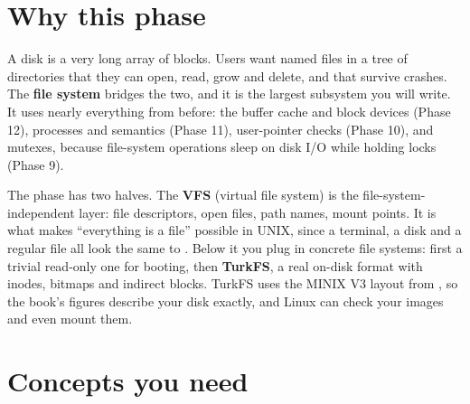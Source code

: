 \documentclass[11pt,a4paper]{article}
\begin{document}


\section{Why this phase}

A disk is a very long array of blocks. Users want named files in a tree of directories that they can open, read,
grow and delete, and that survive crashes. The \textbf{file system} bridges the two, and it is the largest subsystem
you will write. It uses nearly everything from before: the buffer cache and block devices (Phase 12), processes and
 semantics (Phase 11), user-pointer checks (Phase 10), and mutexes, because file-system operations sleep on
disk I/O while holding locks (Phase 9).

The phase has two halves. The \textbf{VFS} (virtual file system) is the file-system-independent layer: file
descriptors, open files, path names, mount points. It is what makes ``everything is a file'' possible in UNIX, since
a terminal, a disk and a regular file all look the same to . Below it you plug in concrete file systems:
first a trivial read-only one for booting, then \textbf{TurkFS}, a real on-disk format with inodes, bitmaps and
indirect blocks. TurkFS uses the MINIX V3 layout from \OSDI, so the book's figures describe your disk exactly, and
Linux can check your images and even mount them.

\section{Concepts you need}
\end{document}
